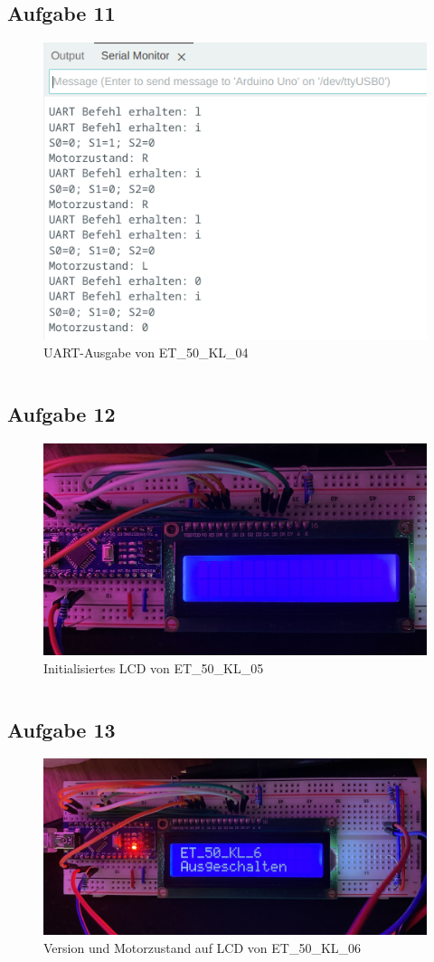 \documentclass{article}
\begin{document}
\clearpage
\subsection{Aufgabe 11}
\begin{figure}[H]
    \centering
    \includegraphics[width=0.75\linewidth]{ET_50_KL_04.png}
    \caption{UART-Ausgabe von ET\_50\_KL\_04}
\end{figure}
\inputminted[linenos]{c++}{res/code/ET_50_KL_04.c}

\clearpage
\subsection{Aufgabe 12}
\begin{figure}[H]
    \centering
    \includegraphics[width=0.75\linewidth]{ET_50_KL_05.jpg}
    \caption{Initialisiertes LCD von ET\_50\_KL\_05}
\end{figure}
\inputminted[linenos]{c++}{res/code/ET_50_KL_05.c}

\clearpage
\subsection{Aufgabe 13}
\begin{figure}[H]
    \centering
    \includegraphics[width=0.75\linewidth]{ET_50_KL_06.jpg}
    \caption{Version und Motorzustand auf LCD von ET\_50\_KL\_06}
\end{figure}
\inputminted[linenos]{c++}{res/code/ET_50_KL_06.c}
\end{document}
